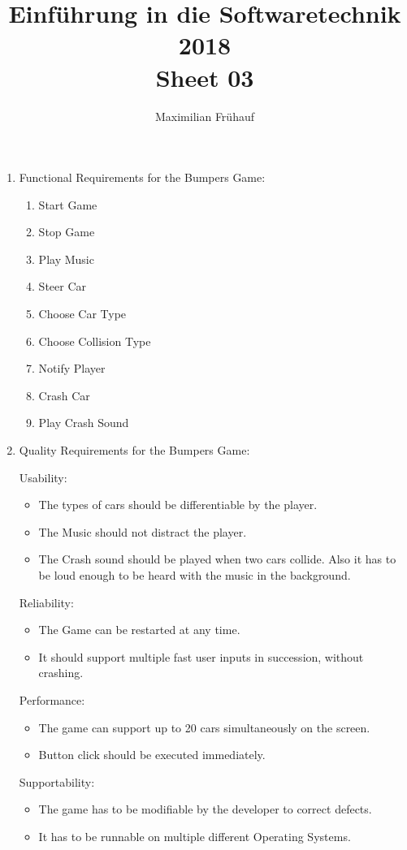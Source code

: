 \documentclass[a4paper, 10pt]{article}
\title{Einführung in die Softwaretechnik 2018 \\ Sheet 03}
\author{Maximilian Frühauf}
\begin{document}
\maketitle
\begin{enumerate}
    \item 
    Functional Requirements for the Bumpers Game:
    \begin{enumerate}
        \item Start Game
        \item Stop Game
        \item Play Music
        \item Steer Car
        \item Choose Car Type
        \item Choose Collision Type
        \item Notify Player
        \item Crash Car
        \item Play Crash Sound
    \end{enumerate}

    \item 
    Quality Requirements for the Bumpers Game:

    Usability:
    \begin{itemize}
        \item The types of cars should be differentiable by the player.
        \item The Music should not distract the player.
        \item The Crash sound should be played when two cars collide. Also it has to 
        be loud enough to be heard with the music in the background. 
    \end{itemize}
    Reliability:
    \begin{itemize}
        \item The Game can be restarted at any time.
        \item It should support multiple fast user inputs in succession, without crashing.
    \end{itemize}

    Performance:
    \begin{itemize}
        \item The game can support up to 20 cars simultaneously on the screen.
        \item Button click should be executed immediately.
    \end{itemize}

    Supportability:
    \begin{itemize}
        \item The game has to be modifiable by the developer to correct defects.
        \item It has to be runnable on multiple different Operating Systems.
    \end{itemize}


\end{enumerate}
\end{document}
